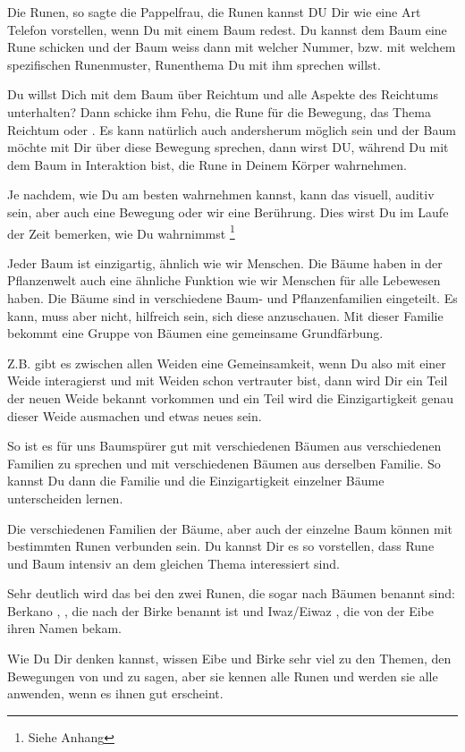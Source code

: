 \documentclass[11pt,titlepage,a5paper]{book}
\begin{document}
Die Runen, so sagte die Pappelfrau, die Runen kannst DU Dir wie eine Art Telefon vorstellen, wenn Du mit einem Baum redest. Du kannst dem Baum eine Rune schicken und der Baum weiss dann mit welcher Nummer, bzw. mit welchem spezifischen Runenmuster, Runenthema Du mit ihm sprechen willst.

Du willst Dich mit dem Baum über Reichtum und alle Aspekte des Reichtums unterhalten? Dann schicke ihm Fehu, die Rune für die Bewegung, das Thema Reichtum  oder . Es kann natürlich auch andersherum möglich sein und der Baum möchte mit Dir über diese Bewegung sprechen, dann wirst DU, während Du mit dem Baum in Interaktion bist, die Rune  in Deinem Körper wahrnehmen.

Je nachdem, wie Du am besten wahrnehmen kannst, kann das visuell, auditiv sein, aber auch eine Bewegung oder wir eine Berührung. Dies wirst Du im Laufe der Zeit bemerken, wie Du wahrnimmst \footnote{Siehe Anhang}

Jeder Baum ist einzigartig, ähnlich wie wir Menschen. Die Bäume haben in der Pflanzenwelt auch eine ähnliche Funktion wie wir Menschen für alle Lebewesen haben. Die Bäume sind in verschiedene Baum- und Pflanzenfamilien eingeteilt. Es kann, muss aber nicht, hilfreich sein, sich diese anzuschauen. Mit dieser Familie bekommt eine Gruppe von Bäumen eine gemeinsame Grundfärbung. 

Z.B. gibt es zwischen allen Weiden eine Gemeinsamkeit, wenn Du also mit einer Weide interagierst und mit Weiden schon vertrauter bist, dann wird Dir ein Teil der neuen Weide bekannt vorkommen und ein Teil wird die Einzigartigkeit genau dieser Weide ausmachen und etwas neues sein.

So ist es für uns Baumspürer gut mit verschiedenen Bäumen aus verschiedenen Familien zu sprechen und mit verschiedenen Bäumen aus derselben Familie. So kannst Du dann die Familie und die Einzigartigkeit einzelner Bäume unterscheiden lernen.

Die verschiedenen Familien der Bäume, aber auch der einzelne Baum können mit bestimmten Runen verbunden sein. Du kannst Dir es so vorstellen, dass Rune und Baum intensiv an dem gleichen Thema interessiert sind.

Sehr deutlich wird das bei den zwei Runen, die sogar nach Bäumen benannt sind: Berkano ,  , die nach der Birke benannt ist und Iwaz/Eiwaz ,  die von der Eibe ihren Namen bekam.

Wie Du Dir denken kannst, wissen Eibe und Birke sehr viel zu den Themen, den Bewegungen von  und  zu sagen, aber sie kennen alle Runen und werden sie alle anwenden, wenn es ihnen gut erscheint.
\end{document}
